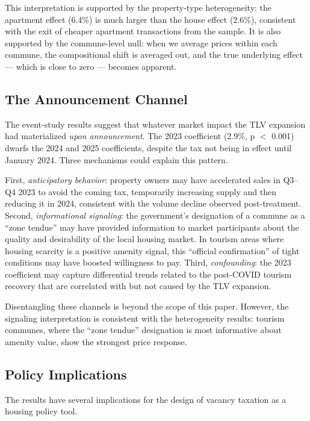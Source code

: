 \documentclass[12pt]{article}
\begin{document}
This interpretation is supported by the property-type heterogeneity: the apartment effect (6.4\%) is much larger than the house effect (2.6\%), consistent with the exit of cheaper apartment transactions from the sample. It is also supported by the commune-level null: when we average prices within each commune, the compositional shift is averaged out, and the true underlying effect --- which is close to zero --- becomes apparent.

\subsection{The Announcement Channel}

The event-study results suggest that whatever market impact the TLV expansion had materialized \textit{upon announcement}. The 2023 coefficient (2.9\%, p $<$ 0.001) dwarfs the 2024 and 2025 coefficients, despite the tax not being in effect until January 2024. Three mechanisms could explain this pattern.

First, \textit{anticipatory behavior}: property owners may have accelerated sales in Q3--Q4 2023 to avoid the coming tax, temporarily increasing supply and then reducing it in 2024, consistent with the volume decline observed post-treatment. Second, \textit{informational signaling}: the government's designation of a commune as a ``zone tendue'' may have provided information to market participants about the quality and desirability of the local housing market. In tourism areas where housing scarcity is a positive amenity signal, this ``official confirmation'' of tight conditions may have boosted willingness to pay. Third, \textit{confounding}: the 2023 coefficient may capture differential trends related to the post-COVID tourism recovery that are correlated with but not caused by the TLV expansion.

Disentangling these channels is beyond the scope of this paper. However, the signaling interpretation is consistent with the heterogeneity results: tourism communes, where the ``zone tendue'' designation is most informative about amenity value, show the strongest price response.

\subsection{Policy Implications}

The results have several implications for the design of vacancy taxation as a housing policy tool.
\end{document}
